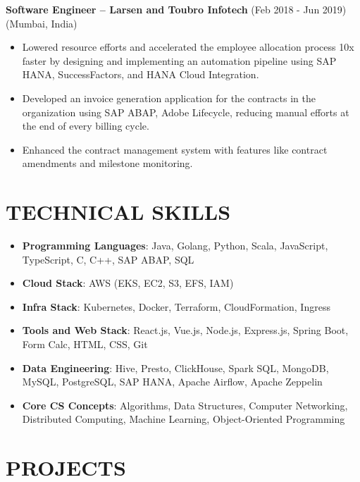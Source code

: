\documentclass[a4paper,10pt]{article}
\begin{document}
\noindent\textbf{Software Engineer – Larsen and Toubro Infotech} (Feb 2018 - Jun 2019) (Mumbai, India)
\begin{itemize}[noitemsep, topsep=0pt]
    \item Lowered resource efforts and accelerated the employee allocation process 10x faster by designing and implementing an automation pipeline using SAP HANA, SuccessFactors, and HANA Cloud Integration.
    \item Developed an invoice generation application for the contracts in the organization using SAP ABAP, Adobe Lifecycle, reducing manual efforts at the end of every billing cycle.
    \item Enhanced the contract management system with features like contract amendments and milestone monitoring.
\end{itemize}

\section*{\textbf{TECHNICAL SKILLS}}
\begin{itemize}[noitemsep, topsep=0pt]
    \item \textbf{Programming Languages}: Java, Golang, Python, Scala, JavaScript, TypeScript, C, C++, SAP ABAP, SQL
    \item \textbf{Cloud Stack}: AWS (EKS, EC2, S3, EFS, IAM)
    \item \textbf{Infra Stack}: Kubernetes, Docker, Terraform, CloudFormation, Ingress
    \item \textbf{Tools and Web Stack}: React.js, Vue.js, Node.js, Express.js, Spring Boot, Form Calc, HTML, CSS, Git
    \item \textbf{Data Engineering}: Hive, Presto, ClickHouse, Spark SQL, MongoDB, MySQL, PostgreSQL, SAP HANA, Apache Airflow, Apache Zeppelin
    \item \textbf{Core CS Concepts}: Algorithms, Data Structures, Computer Networking, Distributed Computing, Machine Learning, Object-Oriented Programming
\end{itemize}

\section*{\textbf{PROJECTS}}
\end{document}
